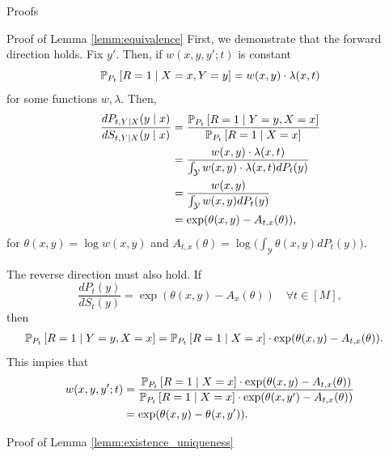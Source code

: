 \documentclass{article}
\theoremstyle{definition}
\theoremstyle{plain}
\theoremstyle{remark}
\begin{document}
\begin{section}{Proofs}

\begin{subsection}{Proof of Lemma \ref{lemm:equivalence}}
First, we demonstrate that the forward direction holds. Fix $y'$. Then, if $w(x, y, y'; t)$ is constant
\[ \PP[P_{t}]{R=1 \mid X=x, Y=y} = w(x, y) \cdot \lambda(x, t)\]
for some functions $w, \lambda$. Then,
\begin{align*}
\frac{dP_{t, Y \mid X}(y \mid x)}{dS_{t, Y \mid X}(y \mid x)}  &=  \frac{\PP[P_{t}]{R =1 \mid Y=y, X=x}}{\PP[P_{t}]{R=1 \mid X=x}} \\
&= \frac{w(x, y) \cdot \lambda(x, t)}{\int_{\mathcal{Y}} w(x, y) \cdot \lambda(x, t) dP_{t}(y)} \\
&= \frac{w(x, y)}{\int_{\mathcal{Y}} w(x, y) dP_{t}(y)} \\
&= \exp(\theta(x, y) - A_{t, x}(\theta)),
\end{align*}
for $\theta(x, y) = \log w(x, y)$ and $A_{t,x}(\theta) = \log \Big( \int_{\mathcal{Y}} \theta(x, y) dP_{t}(y) \Big)$.

The reverse direction must also hold. If 
\[\frac{dP_{t}(y)}{dS_{t}(y)} = \exp(\theta(x, y) - A_{x}(\theta)) \quad \forall t \in [M],\] then
\begin{align*}
\PP[P_{t}]{R =1 \mid Y=y, X=x} &=  \PP[P_{t}]{R=1 \mid X=x} \cdot \exp(\theta(x, y) - A_{t, x}(\theta)).
\end{align*}
This impies that
\begin{align*}
w(x, y, y'; t) &= \frac{ \PP[P_{t}]{R=1 \mid X=x} \cdot \exp(\theta(x, y) - A_{t, x}(\theta)) }{ \PP[P_{t}]{R=1 \mid X=x} \cdot \exp(\theta(x, y') - A_{t, x}(\theta))} \\
&= \exp(\theta(x, y) - \theta(x, y')).
\end{align*}


\end{subsection}



\begin{subsection}{Proof of Lemma \ref{lemm:existence_uniqueness}}


\end{subsection}
\end{section}
\end{document}
